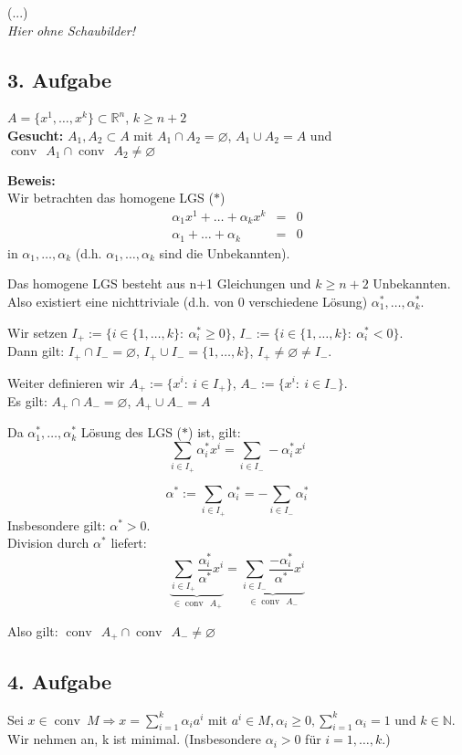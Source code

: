 \documentclass[a4paper,11pt,twoside,titlepage]{article}
\newcommand{\R}{{\mathbb R}}
\newcommand{\N}{{\mathbb N}}
\newcommand{\conv}{{\operatorname{conv}\:}}
\begin{document}
(...)\\
\textit{Hier ohne Schaubilder!}

\subsection*{3. Aufgabe}
$A=\{x^1,\ldots,x^k\}\subset\R^n$, $k\geq n+2$\\
\textbf{Gesucht:} $A_1,A_2\subset A$ mit $A_1\cap A_2=\varnothing$, $A_1\cup A_2=A$ und $\conv\:A_1\cap \conv\:A_2\neq\varnothing$

\textbf{Beweis:}\\
Wir betrachten das homogene LGS ($\ast$)
\begin{eqnarray*}
\alpha_1x^1+\ldots+\alpha_kx^k&=&0\\
\alpha_1+\ldots+\alpha_k&=&0
\end{eqnarray*}
in $\alpha_1,\ldots,\alpha_k$ (d.h. $\alpha_1,\ldots,\alpha_k$ sind die Unbekannten).

Das homogene LGS besteht aus n+1 Gleichungen und $k\geq n+2$ Unbekannten.\\
Also existiert eine nichttriviale (d.h. von 0 verschiedene Lösung) $\alpha_1^*,\ldots,\alpha_k^*$.

Wir setzen $I_+:=\{i\in\{1,\ldots,k\}:\ \alpha_i^*\geq0\}$, $I_-:=\{i\in\{1,\ldots,k\}:\ \alpha_i^*<0\}$.\\
Dann gilt: $I_+\cap I_-=\varnothing$, $I_+\cup I_-=\{1,\ldots,k\}$, $I_+\neq\varnothing\neq I_-$.

Weiter definieren wir $A_+:=\{x^i:\ i\in I_+\}$, $A_-:=\{x^i:\ i\in I_-\}$.\\
Es gilt: $A_+\cap A_-=\varnothing$, $A_+\cup A_-=A$

Da $\alpha_1^*,\ldots,\alpha_k^*$ Lösung des LGS ($\ast$) ist, gilt:
\[\sum_{i\in I_+}\alpha_i^*x^i=\sum_{i\in I_-}-\alpha_i^*x^i\]

\[\alpha^*:=\sum_{i\in I_+}\alpha_i^*=-\sum_{i\in I_-}\alpha_i^*\]
Insbesondere gilt: $\alpha^*>0$.\\
Division durch $\alpha^*$ liefert:
\[\underbrace{\sum_{i\in I_+}\frac{\alpha_i^*}{\alpha^*}x^i}_{\in \conv\:A_+}=\underbrace{\sum_{i\in I_-}\frac{-\alpha_i^*}{\alpha^*}x^i}_{\in \conv\:A_-}\]

Also gilt: $\conv\:A_+\cap \conv\:A_-\neq\varnothing$

\subsection*{4. Aufgabe}
Sei $x\in \conv M \Rightarrow x=\sum\limits_{i=1}^k\alpha_ia^i$ mit $a^i\in M, \alpha_i\geq0, \sum\limits_{i=1}^k\alpha_i=1$ und $k\in\N$.\\
Wir nehmen an, k ist minimal. (Insbesondere $\alpha_i>0$ für $i=1,\ldots,k$.)
\end{document}
